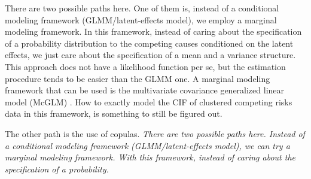 There are two possible paths here. One of them is, instead of a
conditional modeling framework (GLMM/latent-effects model), we employ a
marginal modeling framework. In this framework, instead of caring
about the specification of a probability distribution to the competing
causes conditioned on the latent effects, we just care about the
specification of a mean and a variance structure. This approach does not
have a likelihood function per se, but the estimation procedure tends to
be easier than the GLMM one. A marginal modeling framework that can be
used is the multivariate covariance generalized linear model (McGLM)
\cite{mcglm, rmcglm}. How to exactly model the CIF of clustered
competing risks data in this framework, is something to still be figured
out.

The other path is the use of copulas. \textit{There are two possible
paths here. Instead of a conditional modeling framework
(GLMM/latent-effects model), we can try a marginal modeling
framework. With this framework, instead of caring about the
specification of a probability.}

